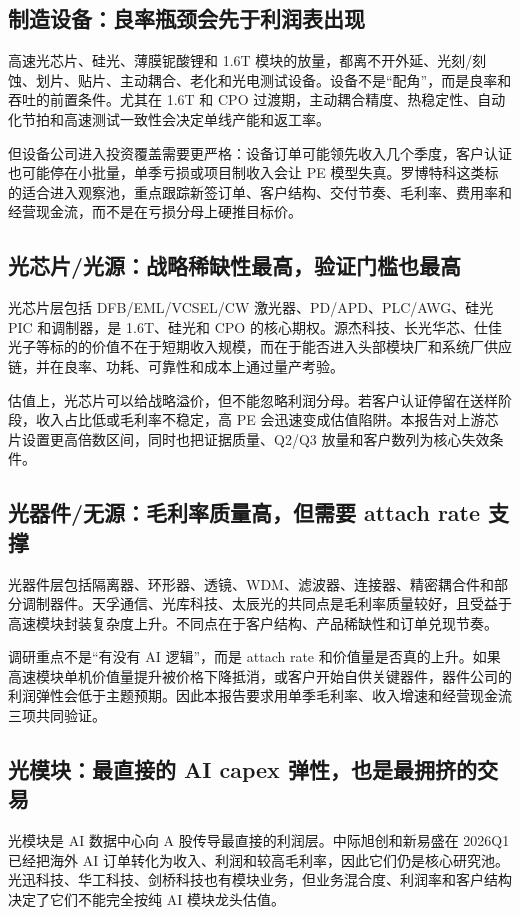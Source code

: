 \subsection{制造设备：良率瓶颈会先于利润表出现}
高速光芯片、硅光、薄膜铌酸锂和 1.6T 模块的放量，都离不开外延、光刻/刻蚀、划片、贴片、主动耦合、老化和光电测试设备。设备不是“配角”，而是良率和吞吐的前置条件。尤其在 1.6T 和 CPO 过渡期，主动耦合精度、热稳定性、自动化节拍和高速测试一致性会决定单线产能和返工率。

但设备公司进入投资覆盖需要更严格：设备订单可能领先收入几个季度，客户认证也可能停在小批量，单季亏损或项目制收入会让 PE 模型失真。罗博特科这类标的适合进入观察池，重点跟踪新签订单、客户结构、交付节奏、毛利率、费用率和经营现金流，而不是在亏损分母上硬推目标价。
\subsection{光芯片/光源：战略稀缺性最高，验证门槛也最高}
光芯片层包括 DFB/EML/VCSEL/CW 激光器、PD/APD、PLC/AWG、硅光 PIC 和调制器，是 1.6T、硅光和 CPO 的核心期权。源杰科技、长光华芯、仕佳光子等标的的价值不在于短期收入规模，而在于能否进入头部模块厂和系统厂供应链，并在良率、功耗、可靠性和成本上通过量产考验。

估值上，光芯片可以给战略溢价，但不能忽略利润分母。若客户认证停留在送样阶段，收入占比低或毛利率不稳定，高 PE 会迅速变成估值陷阱。本报告对上游芯片设置更高倍数区间，同时也把证据质量、Q2/Q3 放量和客户数列为核心失效条件。
\subsection{光器件/无源：毛利率质量高，但需要 attach rate 支撑}
光器件层包括隔离器、环形器、透镜、WDM、滤波器、连接器、精密耦合件和部分调制器件。天孚通信、光库科技、太辰光的共同点是毛利率质量较好，且受益于高速模块封装复杂度上升。不同点在于客户结构、产品稀缺性和订单兑现节奏。

调研重点不是“有没有 AI 逻辑”，而是 attach rate 和价值量是否真的上升。如果高速模块单机价值量提升被价格下降抵消，或客户开始自供关键器件，器件公司的利润弹性会低于主题预期。因此本报告要求用单季毛利率、收入增速和经营现金流三项共同验证。
\subsection{光模块：最直接的 AI capex 弹性，也是最拥挤的交易}
光模块是 AI 数据中心向 A 股传导最直接的利润层。中际旭创和新易盛在 2026Q1 已经把海外 AI 订单转化为收入、利润和较高毛利率，因此它们仍是核心研究池。光迅科技、华工科技、剑桥科技也有模块业务，但业务混合度、利润率和客户结构决定了它们不能完全按纯 AI 模块龙头估值。

